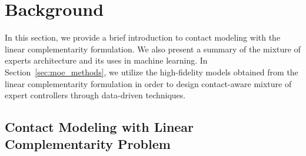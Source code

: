 
\section{Background}

In this section, we provide a brief introduction to contact modeling with the
linear complementarity formulation.
%
We also present a summary of the mixture of experts architecture and
its uses in machine learning.
%
In Section~\ref{sec:moe_methods}, we utilize the high-fidelity models obtained
from the linear complementarity formulation in order to design contact-aware mixture of
expert controllers through data-driven techniques.

\subsection{Contact Modeling with Linear Complementarity Problem}

